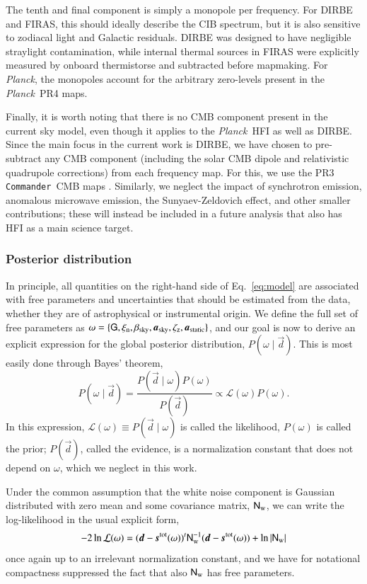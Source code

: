 \documentclass{aa}
\def\commander{\texttt{Commander}}
\def\Planck{\textit{Planck}}
\newcommand{\dv}[0]{\vec{d}}
\newcommand{\G}[0]{\tens{G}}
\newcommand{\s}[0]{\vec{s}}
\renewcommand{\a}[0]{\vec{a}}
\newcommand{\N}[0]{\tens{N}}
\begin{document}
The tenth and final component is simply a monopole per frequency. For
DIRBE and FIRAS, this should ideally describe the CIB spectrum, but it
is also sensitive to zodiacal light and Galactic residuals. DIRBE was designed to have negligible straylight contamination, while internal thermal sources in FIRAS were explicitly measured by onboard thermistorse and subtracted before mapmaking. For
\Planck, the monopoles account for the arbitrary zero-levels present
in the \Planck\ PR4 maps. 

Finally, it is worth noting that there is no CMB component present in
the current sky model, even though it applies to the \Planck\ HFI as
well as DIRBE. Since the main focus in the current work is DIRBE, we
have chosen to pre-subtract any CMB component (including the solar CMB
dipole and relativistic quadrupole corrections) from each frequency
map. For this, we use the PR3 \commander\ CMB maps \citep{planck2016-l04}.
Similarly, we neglect the impact of synchrotron emission,
anomalous microwave emission, the Sunyaev-Zeldovich effect, and other
smaller contributions; these will instead be included in a future
analysis that also has HFI as a main science target.

\subsubsection{Posterior distribution}

In principle, all quantities on the right-hand side of
Eq.~\ref{eq:model} are associated with free parameters and
uncertainties that should be estimated from the data, whether they are
of astrophysical or instrumental origin. We define the full set of
free parameters as $\omega = \{\G,\xi_{\mathrm{n}},
\beta_{\mathrm{sky}},\a_{\mathrm{sky}},\zeta_{\mathrm{z}},\a_{\mathrm{static}}\}$,
and our goal is now to derive an explicit expression for the global
posterior distribution, $P(\omega\mid\dv)$. This is most easily done
through Bayes' theorem,
\begin{equation}
P(\omega\mid\dv) = \frac{P(\dv\mid\omega) P(\omega)}{P(\dv)} \propto
\mathcal{L}(\omega) P(\omega).
\end{equation}
In this expression, $\mathcal{L}(\omega) \equiv  P(\dv\mid\omega)$ is
called the likelihood, $P(\omega)$ is called the prior; $P(\dv)$, called the evidence, is a
normalization constant that does not depend on $\omega$, which we
neglect in this work.

Under the common assumption that the white noise component is Gaussian
distributed with zero mean and some covariance matrix,
$\N_{\mathrm{w}}$, we can write the log-likelihood in the usual
explicit form,
\begin{equation}
-2\ln\mathcal{L}(\omega) = (\dv-\s^{\mathrm{tot}}(\omega))^t
	\N_{\mathrm{w}}^{-1}(\dv-\s^{\mathrm{tot}}(\omega))+\ln|\N_{\mathrm w}|
\end{equation}
once again up to an irrelevant normalization constant, and we have for
notational compactness suppressed the fact that also $\N_{\mathrm{w}}$ has free
parameters.
\end{document}
